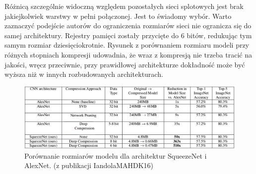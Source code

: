 \documentclass[12pt,a4paper,twoside,titlepage,openright]{book}
\begin{document}
Różnicą szczególnie widoczną względem pozostałych sieci splotowych jest brak jakiejkolwiek warstwy w pełni połączonej. Jest to świadomy wybór. Warto zaznaczyć podejście autorów do ograniczenia rozmiarów sieci nie ogranicza się do samej architektury. Rejestry pamięci zostały przycięte do 6 bitów, redukując tym samym rozmiar dziesięciokrotnie. Rysunek z porównaniem rozmiaru modeli przy różnych stopniach kompresji udowadnia, że wraz z kompresją nie trzeba tracić na jakości, wręcz przeciwnie, przy prawidłowej architekturze dokładność może być wyższa niż w innych rozbudowanych architekturach. \cite{DBLP:journals/corr/IandolaMAHDK16}

\begin{figure}[ht]
	\centering
			\includegraphics[resolution=100, scale=0.55]{squeezeNetCompression.png}
		\caption{Porównanie rozmiarów modelu dla architektur SqueezeNet i AlexNet. (z publikacji IandolaMAHDK16)}
\end{figure}
\end{document}
